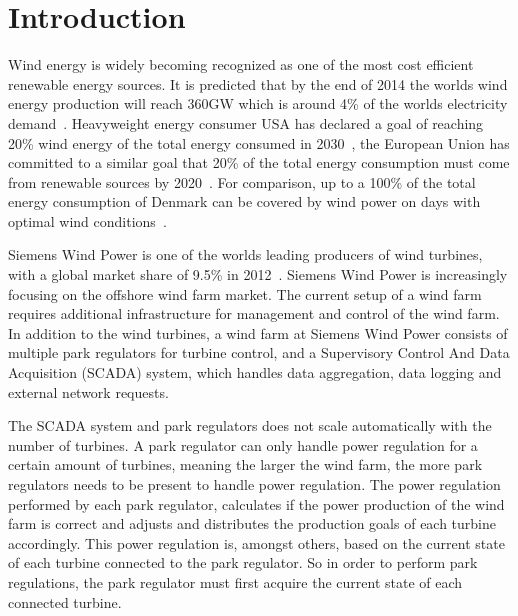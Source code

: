 \chapter{Introduction}
\label{chap:intro}

Wind energy is widely becoming recognized as one of the most cost efficient renewable energy sources.
It is predicted that by the end of 2014 the worlds wind energy production will reach 360GW which is around 4\% of the worlds electricity demand~\cite{worldwidewindcapacity}.
Heavyweight energy consumer USA has declared a goal of reaching 20\% wind energy of the total energy consumed in 2030~\cite{20percentenergy}, the European Union has committed to a similar goal that 20\% of the total energy consumption must come from renewable sources by 2020~\cite{directive2009}. For comparison, up to a 100\% of the total energy consumption of Denmark can be covered by wind power on days with optimal wind conditions~\cite{100percentwindenergy}.

Siemens Wind Power is one of the worlds leading producers of wind turbines, with a global market share of 9.5\% in 2012~\cite{worldmarketupdate2012}.
Siemens Wind Power is increasingly focusing on the offshore wind farm market.
The current setup of a wind farm requires additional infrastructure for management and control of the wind farm.
In addition to the wind turbines, a wind farm at Siemens Wind Power consists of multiple park regulators for turbine control, and a Supervisory Control And Data Acquisition (SCADA) system, which handles data aggregation, data logging and external network requests.

The SCADA system and park regulators does not scale automatically with the number of turbines. A park regulator can only handle power regulation for a certain amount of turbines, meaning the larger the wind farm, the more park regulators needs to be present to handle power regulation.
The power regulation performed by each park regulator, calculates if the power production of the wind farm is correct and adjusts and distributes the production goals of each turbine accordingly. This power regulation is, amongst others, based on the current state of each turbine connected to the park regulator. So in order to perform park regulations, the park regulator must first acquire the current state of each connected turbine.

